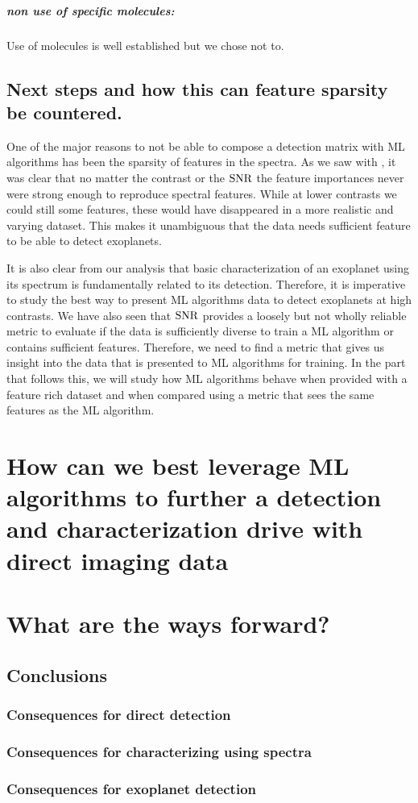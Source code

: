 \paragraph{non use of specific molecules:\\}
Use of molecules is well established but we chose not to.

\section{Next steps and how this can feature sparsity be countered.}
One of the major reasons to not be able to compose a detection matrix with ML algorithms has been the sparsity of features in the spectra.
As we saw with , it was clear that no matter the contrast or the $\rm{SNR}$ the feature importances never were strong enough to reproduce spectral features.
While at lower contrasts we could still some features, these would have disappeared in a more realistic and varying dataset.
This makes it unambiguous that the data needs sufficient feature to be able to detect exoplanets.

It is also clear from our analysis that basic characterization of an exoplanet using its spectrum is fundamentally related to its detection. 
Therefore, it is imperative to study the best way to present ML algorithms data to detect exoplanets at high contrasts.
We have also seen that $\rm{SNR}$ provides a loosely but not wholly reliable metric to evaluate if the data is sufficiently diverse to train a ML algorithm or contains sufficient features.
Therefore, we need to find a metric that gives us insight into the data that is presented to ML algorithms for training.
In the part that follows this, we will study how ML algorithms behave when provided with a feature rich dataset and when compared using a metric that sees the same features as the ML algorithm.

\chapter{How can we best leverage ML algorithms to further a detection and characterization drive with direct imaging data}
\chapter{What are the ways forward?}
\section{Conclusions}
\subsection{Consequences for direct detection}
\subsection{Consequences for characterizing using spectra}
\subsection{Consequences for exoplanet detection}